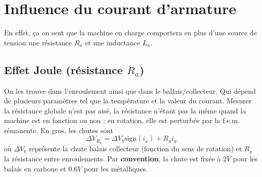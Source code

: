 			
\section{Influence du courant d'armature}
En effet, ça on sent que la machine en charge comportera en plus d'une 
source de tension une résistance $R_a$ et une inductance $L_a$.

	\subsection{Effet Joule (résistance $R_a$)}
	On les trouve dans l'enroulement ainsi que dans le ballais/collecteur.
	Qui dépend de plusieurs paramètres tel que la température et la valeur du courant.
	Mesurer la résistance globale n'est pas aisé, la résistance n'étant 
	pas la même quand la machine est en fonction ou non : en rotation, 
	elle est perturbée par la f.e.m. rémanente. En gros, les chutes sont 
	\begin{equation}
	\Delta V_{R_a} = \Delta V_b\text{sign}(i_a) + R_ai_a
	\end{equation}
	où $\Delta V_b$ représente la chute balais collecteur (fonction du 
	sens de rotation) et $R_a$ la résistance entre enroulements. Par 
	\textbf{convention}, la chute est fixée à $2V$ pour les balais en 
	carbone et $0.6V$ pour les métalliques.
	
